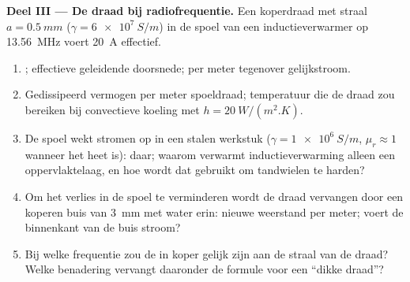 \begin{problem}
\medskip
\noindent\textbf{Deel III --- De draad bij radiofrequentie.}
Een koperdraad met straal $a = \qty{0.5}{mm}$ ($\gamma = \qty{6e7}{S/m}$) in
de spoel van een inductieverwarmer op \qty{13.56}{MHz} voert \qty{20}{A}
effectief.
\begin{enumerate}[resume]
  \item {}; effectieve geleidende doorsnede;
         per meter tegenover gelijkstroom.
  \item Gedissipeerd vermogen per meter spoeldraad; temperatuur die de draad
        zou bereiken bij convectieve koeling met $h = \qty{20}{W/(m^2.K)}$.
  \item De spoel wekt stromen op in een stalen werkstuk
        ($\gamma =
        \qty{1e6}{S/m}$, $\mu_r \approx 1$ wanneer het heet is):
         daar; waarom verwarmt inductieverwarming alleen een
        oppervlaktelaag, en hoe wordt dat gebruikt om tandwielen te harden?
  \item Om het verlies in de spoel te verminderen wordt de draad vervangen
        door een koperen buis van \qty{3}{mm} met water erin: nieuwe
        weerstand per meter; voert de binnenkant van de buis stroom?
  \item Bij welke frequentie zou de  in koper gelijk zijn aan
        de straal van de draad? Welke benadering vervangt daaronder de
        formule voor een ``dikke draad''?
\end{enumerate}


\end{problem}
